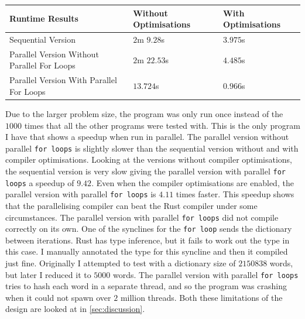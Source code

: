 \begin{tabularx}{\textwidth}{ | >{\centering\arraybackslash}X | >{\centering\arraybackslash}X | >{\centering\arraybackslash}X |}
	\hline
    Runtime Results & Without Optimisations & With Optimisations \\
    \hline
    Sequential Version & $2$m $9.28$s & $3.975$s \\
    \hline
    Parallel Version \hspace{5em} Without Parallel For Loops & $2$m $22.53$s & $4.485$s \\
    \hline
    Parallel Version \hspace{5em} With Parallel For Loops & $13.724$s & $0.966$s \\
    \hline
\end{tabularx}

Due to the larger problem size, the program was only run once instead of the $1000$ times that all the other programs were tested with. This is the only program I have that shows a speedup when run in parallel. The parallel version without parallel \texttt{for loops} is slightly slower than the sequential version without and with compiler optimisations. Looking at the versions without compiler optimisations, the sequential version is very slow giving the parallel version with parallel \texttt{for loops} a speedup of $9.42$. Even when the compiler optimisations are enabled, the parallel version with parallel \texttt{for loops} is $4.11$ times faster. This speedup shows that the parallelising compiler can beat the Rust compiler under some circumstances.
The parallel version with parallel \texttt{for loops} did not compile correctly on its own. One of the synclines for the \texttt{for loop} sends the dictionary between iterations. Rust has type inference, but it fails to work out the type in this case. I manually annotated the type for this syncline and then it compiled just fine. Originally I attempted to test with a dictionary size of $2150838$ words, but later I reduced it to $5000$ words. The parallel version with parallel \texttt{for loops} tries to hash each word in a separate thread, and so the program was crashing when it could not spawn over $2$ million threads. Both these limitations of the design are looked at in \autoref{sec:discussion}.

